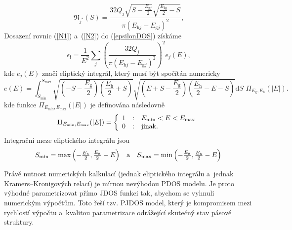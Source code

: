 \begin{equation}
\label{N2}
\mathfrak{N}_{j^*}(S) = 
\frac{
		32Q_j 
		\sqrt{S-\frac{E_{\mathrm{g}j}}{2}}
		\sqrt{\frac{E_{\mathrm{h}j}}{2}-S}
	}{
		\pi (E_{\mathrm{h}j} - E_{\mathrm{g}j})^2
	}
\text{,}
\end{equation}
Dosazení rovnic (\ref{N1}) a~(\ref{N2}) do (\ref{epsilonDOS}) získáme
\begin{equation}
\epsilon_\mathrm{i} = \frac{1}{E^2} \sum_j \left(\frac{32Q_j}{\pi (E_{\mathrm{h}j} - E_{\mathrm{g}j})^2}\right)^2 e_j(E) \text{,}
\end{equation}
kde $e_j(E)$ značí eliptický integrál, který musí být spočítán numericky
\begin{equation}
e(E) = \int_{S_\mathrm{min}}^{S_\mathrm{max}}
\sqrt{\left(-S - \frac{E_\mathrm{g}}{2}\right)\left(\frac{E_\mathrm{h}}{2} + S\right)}
\sqrt{\left(E + S - \frac{E_\mathrm{g}}{2}\right)\left(\frac{E_\mathrm{h}}{2} -E - S\right)}
\mathrm{d}S\,\,\Pi_{E_{\mathrm{g}},E_{\mathrm{h}}}(|E|)\text{.}
\end{equation}
kde funkce $\Pi_{E_\mathrm{min},E_\mathrm{max}}(|E|)$ je definována následovně
\begin{equation}
\Pi_{E_\mathrm{min},E_\mathrm{max}}(|E|) = 
	\left\{\begin{array}{l c l} 
	1 & : & E_\mathrm{min} < E < E_\mathrm{max} \\
	0 & : & \text{jinak.} \end{array} \right.
\end{equation}
Integrační meze eliptického integrálu jsou 
\begin{equation}
\begin{array}{l c r}
S_\mathrm{min} = \max\left(-\frac{E_\mathrm{h}}{2}, \frac{E_\mathrm{g}}{2} -E\right) &
\text{a} &
S_\mathrm{max} = \min\left(-\frac{E_\mathrm{g}}{2}, \frac{E_\mathrm{h}}{2} -E\right) \\
\end{array}
\end{equation}



Právě nutnost numerických kalkulací (jednak eliptického integrálu a~jednak Kramers--Kronigových relací) je mírnou nevýhodou PDOS modelu. Je proto výhodné parametrizovat přímo JDOS funkci tak, abychom se vyhnuli numerickým výpočtům. Toto řeší tzv. PJDOS model, který je kompromisem mezi rychlostí výpočtu a~kvalitou parametrizace odrážející skutečný stav pásové struktury. 


